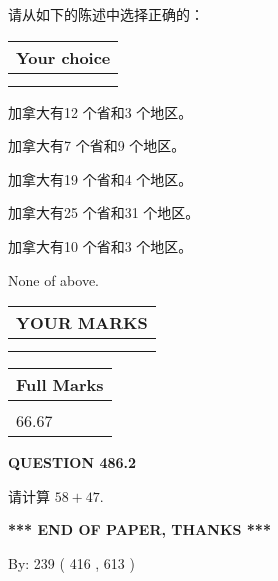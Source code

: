 \documentclass{ctexart}
\begin{document}
  
请从如下的陈述中选择正确的：
  
  
\noindent\hspace{3.0in} \begin{tabular}{|l|}
\hline
Your choice \\
\hline
 \\ 
 \\ 
\hline
\end{tabular}
  
  
 
 
加拿大有12 个省和3 个地区。
 
 
加拿大有7 个省和9 个地区。
 
 
加拿大有19 个省和4 个地区。
 
 
加拿大有25 个省和31 个地区。
 
 
加拿大有10 个省和3 个地区。
 
 
 None of above.
 
 
  
\vspace{0.2in}
  
\noindent\begin{tabular}{|l|}
\hline
 YOUR MARKS  \\
\hline
 \\ 
 \\ 
\hline
\end{tabular}
\hspace{0.05in} \begin{tabular}{|l|}
\hline
 Full Marks  \\
\hline
 \\ 
66.67 \\
\hline
\end{tabular}
{\textbf{\Large{QUESTION
486.2 
}}}
  
  
 
请计算 $ %
58 +  %
47 $.
 

 

 
   
   
 \vspace{0.2in}
 
   
   
   
   
\vspace{1.0in} 
{\textbf{\large{ *** END OF PAPER, THANKS *** }}} 
   
   
\hspace{1.0in} By: 
 239 ( 416 ,  613 )
   
\end{document}
